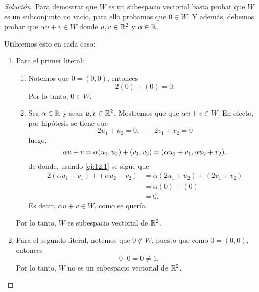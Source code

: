 \documentclass[a4,11pt]{aleph-notas}
\begin{document}
\begin{proof}[Solución]\hspace{0pt}
    Para demostrar que $W$ es un subespacio vectorial basta probar que $W$ es un subconjunto no vacío, para ello probamos que $0\in W$. Y además, debemos probar que $\alpha u +v\in W$ donde $u,v \in\mathbb{R}^2$ y $\alpha \in\mathbb{R}$.

    Utilicemos esto en cada caso:
    \begin{enumerate}
        \item 
        Para el primer literal:
        \begin{enumerate}
            \item Notemos que $0 = (0,0)$, entonces
                \[
                    2 (0) + (0) = 0.
                \]
                Por lo tanto, $0\in W$.
            \item Sea $\alpha \in \mathbb{R}$ y sean $u,v\in\mathbb{R}^2$. Mostremos que que $\alpha u + v \in W$. En efecto, por hipótesis se tiene que
                \begin{equation}\label{ej:12.1}
                    2 u_1 + u_2 = 0, \qquad 2 v_1 + v_2 = 0
                \end{equation}
                luego,
                \[
                    \alpha u + v  = \alpha (u_1,u_2) + (v_1,v_2) \\
                     = (\alpha u_1 + v_1, \alpha u_2 + v_2).
                \]
                de donde, usando \eqref{ej:12.1} se sigue que 
                \begin{align*}
                    2(\alpha u_1 + v_1) + (\alpha u_2 + v_2) 
                    &= \alpha( 2 u_1 + u_2) + (2 v_1 + v_2) \\
                    &= \alpha( 0 ) + ( 0 ) \\
                    &= 0.
                \end{align*}
                Es decir, $\alpha u + v\in W$, como se quería.
        \end{enumerate}
        Por lo tanto, $W$ es subespacio vectorial de $\mathbb{R}^2$. 
    \item 
        Para el segundo literal, notemos que 
        $0 \notin W$,  puesto que como $0 = (0,0)$, entonces
        \[
            0\cdot 0 = 0 \neq 1.
        \]
        Por lo tanto, $W$ no es un subespacio vectorial de $\mathbb{R}^2$. \qedhere
    \end{enumerate}
\end{proof}
\end{document}
